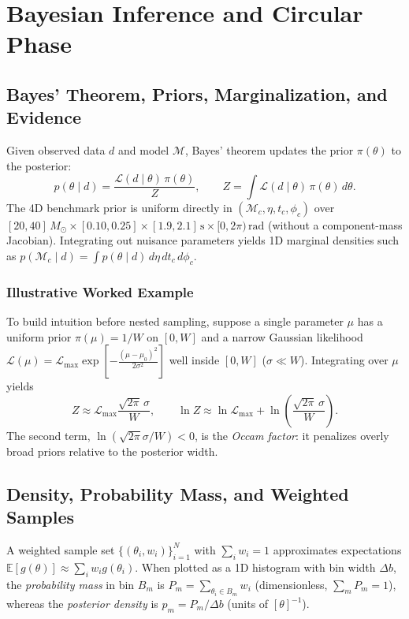 \documentclass[11pt,a4paper]{report}
\begin{document}
\chapter{Bayesian Inference and Circular Phase}

\section{Bayes' Theorem, Priors, Marginalization, and Evidence}
Given observed data $d$ and model $\mathcal{M}$, Bayes' theorem updates the prior $\pi(\theta)$ to the posterior:
\begin{equation}
p(\theta \mid d) = \frac{\mathcal{L}(d \mid \theta)\,\pi(\theta)}{Z}, \qquad Z = \int \mathcal{L}(d \mid \theta)\,\pi(\theta)\,d\theta.
\end{equation}
The 4D benchmark prior is uniform directly in $(\mathcal{M}_c, \eta, t_c, \phi_c)$ over $[20, 40]\,M_\odot \times [0.10, 0.25] \times [1.9, 2.1]\,\mathrm{s} \times [0, 2\pi)\,\mathrm{rad}$ (without a component-mass Jacobian). Integrating out nuisance parameters yields 1D marginal densities such as $p(\mathcal{M}_c \mid d) = \int p(\theta \mid d)\,d\eta\,dt_c\,d\phi_c$.

\subsection{Illustrative Worked Example}
To build intuition before nested sampling, suppose a single parameter $\mu$ has a uniform prior $\pi(\mu) = 1/W$ on $[0, W]$ and a narrow Gaussian likelihood $\mathcal{L}(\mu) = \mathcal{L}_{\max}\exp\!\left[-\frac{(\mu - \mu_0)^2}{2\sigma^2}\right]$ well inside $[0, W]$ ($\sigma \ll W$). Integrating over $\mu$ yields
\begin{equation}
Z \approx \mathcal{L}_{\max}\frac{\sqrt{2\pi}\,\sigma}{W}, \qquad \ln Z \approx \ln \mathcal{L}_{\max} + \ln\!\left(\frac{\sqrt{2\pi}\,\sigma}{W}\right).
\end{equation}
The second term, $\ln(\sqrt{2\pi}\sigma / W) < 0$, is the \emph{Occam factor}: it penalizes overly broad priors relative to the posterior width.

\section{Density, Probability Mass, and Weighted Samples}
A weighted sample set $\{(\theta_i, w_i)\}_{i=1}^{N}$ with $\sum_i w_i = 1$ approximates expectations $\mathbb{E}[g(\theta)] \approx \sum_i w_i g(\theta_i)$. When plotted as a 1D histogram with bin width $\Delta b$, the \emph{probability mass} in bin $B_m$ is $P_m = \sum_{\theta_i \in B_m} w_i$ (dimensionless, $\sum_m P_m = 1$), whereas the \emph{posterior density} is $p_m = P_m / \Delta b$ (units of $[\theta]^{-1}$).
\end{document}
